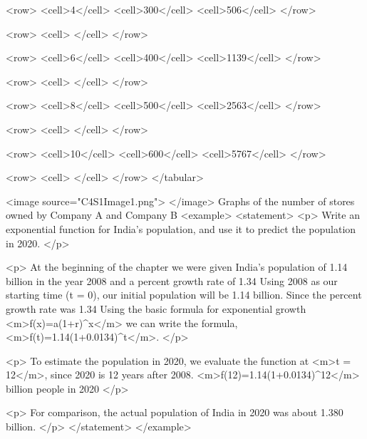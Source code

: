            <row>
                <cell>4</cell>
                <cell>300</cell>
                <cell>506</cell>
            </row>

            <row>
                <cell> </cell>
            </row>

            <row>
                <cell>6</cell>
                <cell>400</cell>
                <cell>1139</cell>
            </row>

            <row>
                <cell> </cell>
            </row>

            <row>
                <cell>8</cell>
                <cell>500</cell>
                <cell>2563</cell>
            </row>

            <row>
                <cell> </cell>
            </row>

            <row>
                <cell>10</cell>
                <cell>600</cell>
                <cell>5767</cell>
            </row>

            <row>
                <cell> </cell>
            </row>
        </tabular>

        <image source="C4S1Image1.png">
        </image>
        Graphs of the number of stores owned by Company A and Company B
        <example>
            <statement>
                <p>
                    Write an exponential function for India’s population, and use it to predict the population in 2020.
                </p>

                <p>
                    At the beginning of the chapter we were given India’s population of 1.14 billion in the year 2008 and a percent growth rate of 1.34%
                    Using 2008 as our starting time (t = 0), our initial population will be 1.14 billion.
                    Since the percent growth rate was 1.34%
                    Using the basic formula for exponential growth <m>f(x)=a(1+r)^{x}</m> we can write the formula, <m>f(t)=1.14(1+0.0134)^{t}</m>.
                </p>

                <p>
                    To estimate the population in 2020, we evaluate the function at <m>t = 12</m>, since 2020 is 12 years after 2008.
                    <m>f(12)=1.14(1+0.0134)^{12}</m> billion people in 2020
                </p>

                <p>
                    For comparison, the actual population of India in 2020 was about 1.380 billion.
                </p>
            </statement>
        </example>

